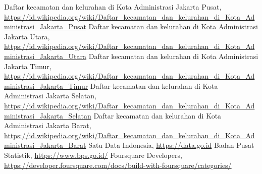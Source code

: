 \documentclass[a4paper,
							12pt,
							oneside,
							openright,
							DIV10,
							numbers=noendperiod
							]{scrreprt} %
\begin{document}



\newcommand{\equal}{=}	

	
\pagestyle{plain}
\makeatletter
\newcommand\tinyv{\@setfontsize\tinyv{5.00pt}{7}}
\newcommand\tinyx{\@setfontsize\tinyx{4.95pt}{7}}
\makeatother

\renewcommand*\contentsname{Table of Contents}
\setcounter{tocdepth}{2}
\setcounter{lofdepth}{2}

\tableofcontents
{}








\begin{thebibliography}{1}
		Daftar kecamatan dan kelurahan di Kota Administrasi Jakarta Pusat, 
		\url{https://id.wikipedia.org/wiki/Daftar_kecamatan_dan_kelurahan_di_Kota_Administrasi_Jakarta_Pusat}
		Daftar kecamatan dan kelurahan di Kota Administrasi Jakarta Utara, 
		\url{https://id.wikipedia.org/wiki/Daftar_kecamatan_dan_kelurahan_di_Kota_Administrasi_Jakarta_Utara}
		Daftar kecamatan dan kelurahan di Kota Administrasi Jakarta Timur, 
		\url{https://id.wikipedia.org/wiki/Daftar_kecamatan_dan_kelurahan_di_Kota_Administrasi_Jakarta_Timur}
		Daftar kecamatan dan kelurahan di Kota Administrasi Jakarta Selatan, 
		\url{https://id.wikipedia.org/wiki/Daftar_kecamatan_dan_kelurahan_di_Kota_Administrasi_Jakarta_Selatan}
		Daftar kecamatan dan kelurahan di Kota Administrasi Jakarta Barat, 
		\url{https://id.wikipedia.org/wiki/Daftar_kecamatan_dan_kelurahan_di_Kota_Administrasi_Jakarta_Barat}
		Satu Data Indonesia, 
		\url{https://data.go.id}
		Badan Pusat Statistik, 
		\url{https://www.bps.go.id/}
		Foursquare Developers, \url{https://developer.foursquare.com/docs/build-with-foursquare/categories/}
	
\end{thebibliography}

\end{document}
